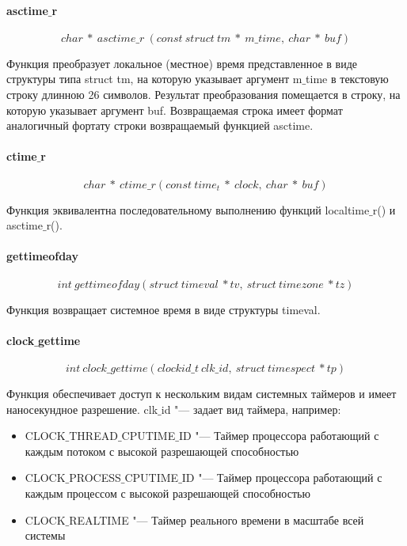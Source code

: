 \documentclass{article}
\begin{document}
			\paragraph*{asctime$\_$r}			
			$$char~*~asctime\_r~(const~struct~tm~*~m\_time,~char~*~buf)$$			
			
				Функция преобразует локальное (местное) время представленное в виде структуры типа struct tm, на которую 						указывает аргумент m$\_$time в текстовую строку длинною 26 символов. Результат преобразования помещается в строку, на 			которую указывает аргумент buf. Возвращаемая строка имеет формат аналогичный фортату строки возвращаемый функцией 					asctime.
				
			\paragraph*{ctime$\_$r}				
				$$char~*~ctime\_r(const~time_t~*~clock,~char~*~buf)$$

				Функция эквивалентна последовательному выполнению функций localtime$\_$r() и asctime$\_$r().
			
			\paragraph*{gettimeofday}
			$$int~gettimeofday(struct~timeval~*tv,~struct~timezone~*tz)$$ 
			
				Функция возвращает системное время в виде структуры timeval.
			\paragraph*{clock$\_$gettime}
			$$int~clock\_gettime(clockid\_t~clk\_id,~struct~timespect~*tp)$$
			
				Функция обеспечивает доступ к нескольким видам системных таймеров и имеет наносекундное разрешение. 
			clk$\_$id  "--- задает вид таймера, например:
			\begin{itemize}
				\item CLOCK$\_$THREAD$\_$CPUTIME$\_$ID "---	Таймер процессора работающий с каждым потоком с высокой разрешающей 						способностью		
				\item CLOCK$\_$PROCESS$\_$CPUTIME$\_$ID "---	Таймер процессора работающий с каждым процессом с высокой 								разрешающей способностью
				\item CLOCK$\_$REALTIME "--- Таймер реального времени в масштабе всей системы
			\end{itemize}	
\end{document}
